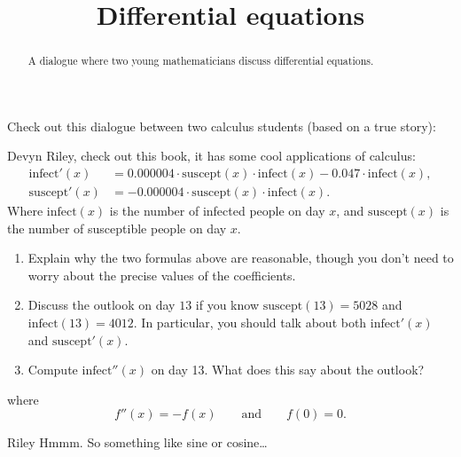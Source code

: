 \documentclass{ximera}
\title[Break-Ground:]{Differential equations}
\begin{document}
\begin{abstract}
  A dialogue where two young mathematicians discuss differential equations.
\end{abstract}
\maketitle







Check out this dialogue between two calculus students (based on a true
story):

\begin{dialogue}
\item[Devyn] Riley, check out this book, it has some cool applications
  of calculus:
\begin{align*}
  \mathrm{infect}'(x) &= 0.000004 \cdot \mathrm{suscept}(x) \cdot \mathrm{infect}(x) - 0.047\cdot \mathrm{infect}(x),\\
  \mathrm{suscept}'(x)&= -0.000004 \cdot \mathrm{suscept}(x) \cdot \mathrm{infect}(x).
\end{align*}
Where $\mathrm{infect}(x)$ is the number of infected people on day
$x$, and $\mathrm{suscept}(x)$ is the number of susceptible people on
day $x$. 
\begin{enumerate}
\item Explain why the two formulas above are reasonable, though you
  don't need to worry about the precise values of the coefficients.
\item Discuss the outlook on day $13$ if you know
  $\mathrm{suscept}(13) = 5028$ and $\mathrm{infect}(13) = 4012$. In
  particular, you should talk about both $\mathrm{infect}'(x)$ and
  $\mathrm{suscept}'(x)$.
\item Compute $\mathrm{infect}''(x)$ on day 13. What does this say
  about the outlook?
\end{enumerate}
  
  where
  \[
  f''(x) = -f(x) \qquad\text{and}\qquad f(0) = 0.
  \]
\item[Riley] Hmmm. So something like sine or cosine\dots
  



\end{dialogue}



\end{document}
